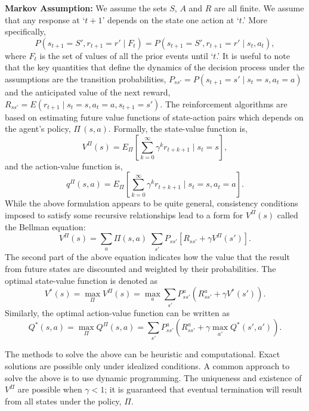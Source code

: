 \noindent\textbf{Markov Assumption:} We assume the sets $S$, $A$ and $R$ are all finite. We assume that any response at `$t+1$' depends on the state one action at `$t$.' More specifically, 
	\begin{equation} \label{eqn:pstpone}
	P(s_{t+1}=S', r_{t+1}=r'  \;|\; F_t)= P(s_{t+1}=S', r_{t+1}=r'  \;|\; s_t,a_t),
	\end{equation}
where $F_t$ is the set of values of all the prior events until `$t$.' It is useful to note that the key quantities that define the dynamics of the decision process under the assumptions are the transition probabilities, $P_{ss'}= P(s_{t+1}=s' \;|\; s_t=s, a_t=a)$ and the anticipated value of the next reward, $R_{ss'}= E(r_{t+1} \;|\; s_t= s, a_t= a, s_{t+1}= s')$. The reinforcement algorithms are based on estimating future value functions of state-action pairs which depends on the agent's policy, $\Pi\, (s,a)$. Formally, the state-value function is,
	\begin{equation} \label{eqn:statevalue}
	V^\Pi(s)= E_\Pi \left[ \sum_{k=0}^\infty \gamma^k r_{t+k+1} \;|\; s_t=s \right],
	\end{equation}
and the action-value function is,
	\begin{equation} \label{eqn:actionvalue}
	q^\Pi(s,a)= E_\Pi \left[ \sum_{k=0}^\infty \gamma^k r_{t+k+1} \;|\; s_t=s, a_t=a \right].
	\end{equation}
While the above formulation appears to be quite general, consistency conditions imposed to satisfy some recursive relationships lead to a form for $V^\Pi(s)$ called the Bellman equation:
	\begin{equation} \label{eqn:vprods}
	V^\Pi(s)= \sum_a \Pi (s,a) \; \sum_{s'} P_{ss'} [ R_{ss'} + \gamma V^\Pi(s')].
	\end{equation}
The second part of the above equation indicates how the value that the result from future states are discounted and weighted by their probabilities. The optimal state-value function is denoted as
	\begin{equation} \label{eqn:statevstar}
	V^*(s)= \max_\Pi V^\Pi(s)= \max_a \sum_{s'} P_{ss'}^a(R_{ss'}^a + \gamma V^*(s')).
	\end{equation}
Similarly, the optimal action-value function can be written as
	\begin{equation} \label{eqn:actionvalueqstar}
	Q^*(s,a)= \max_\Pi Q^\Pi(s,a)= \sum_{s'} P_{ss'}^a( R_{ss'}^a + \gamma \max_{a'} Q^*(s',a') ).
	\end{equation}


The methods to solve the above can be heuristic and computational. Exact solutions are possible only under idealized conditions. A common approach to solve the above is to use dynamic programming. The uniqueness and existence of $V^\Pi$ are possible when $\gamma < 1$; it is guaranteed that eventual termination will result from all states under the policy, $\Pi$. 